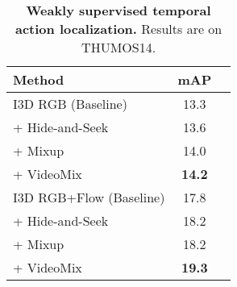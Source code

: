 \begin{table}[t]
\centering
\begin{tabular}{@{}lcc@{}}
\toprule
Method & mAP \\ \midrule
I3D RGB (Baseline) & 13.3 \\
+ Hide-and-Seek~\cite{singh2017hide} & 13.6 \\
+ Mixup~\cite{zhang2017mixup} & 14.0 \\
+ VideoMix & \textbf{14.2} \\ \midrule
I3D RGB+Flow (Baseline) & 17.8 \\
+ Hide-and-Seek~\cite{singh2017hide} & 18.2 \\
+ Mixup~\cite{zhang2017mixup} & 18.2 \\ 
+ VideoMix & \textbf{19.3} \\ \midrule
\end{tabular}
\caption{\textbf{Weakly supervised temporal action localization.} Results are on THUMOS14.
}
\label{table:experiment:wstal}
\end{table}


